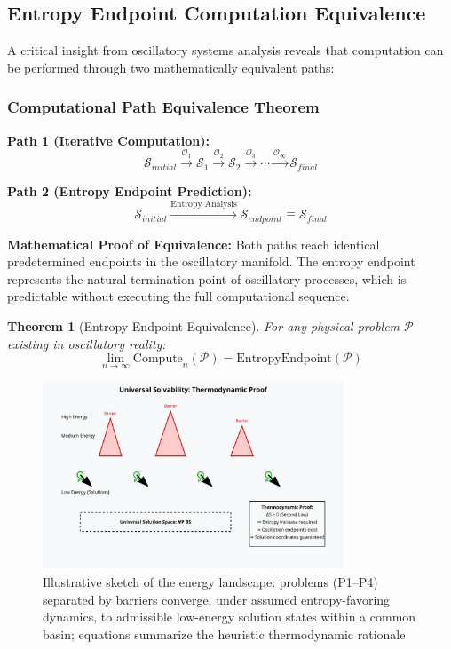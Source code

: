 \documentclass[12pt,a4paper]{article}
\newtheorem{theorem}{Theorem}
\begin{document}
\subsection{Entropy Endpoint Computation Equivalence}

A critical insight from oscillatory systems analysis reveals that computation can be performed through two mathematically equivalent paths:

\subsubsection{Computational Path Equivalence Theorem}

\textbf{Path 1 (Iterative Computation):}
\begin{equation}
\mathcal{S}_{initial} \xrightarrow{\mathcal{O}_1} \mathcal{S}_1 \xrightarrow{\mathcal{O}_2} \mathcal{S}_2 \xrightarrow{\mathcal{O}_3} \cdots \xrightarrow{\mathcal{O}_\infty} \mathcal{S}_{final}
\end{equation}

\textbf{Path 2 (Entropy Endpoint Prediction):}
\begin{equation}
\mathcal{S}_{initial} \xrightarrow{\text{Entropy Analysis}} \mathcal{S}_{endpoint} \equiv \mathcal{S}_{final}
\end{equation}

\textbf{Mathematical Proof of Equivalence:}
Both paths reach identical predetermined endpoints in the oscillatory manifold. The entropy endpoint represents the natural termination point of oscillatory processes, which is predictable without executing the full computational sequence.

\begin{theorem}[Entropy Endpoint Equivalence]
For any physical problem $\mathcal{P}$ existing in oscillatory reality:
\begin{equation}
\lim_{n \to \infty} \text{Compute}_n(\mathcal{P}) = \text{EntropyEndpoint}(\mathcal{P})
\end{equation}
\end{theorem}


\begin{figure}[H]
    \centering
    \includegraphics[width=0.8\textwidth]{images/universal-solvability-thermodynamic-proof.pdf}
    \caption{Illustrative sketch of the  energy landscape: problems (P1–P4) separated by barriers converge, under assumed entropy-favoring dynamics, to admissible low-energy solution states within a common basin; equations summarize the heuristic thermodynamic rationale}
    \label{fig:universal_computing}
    \end{figure}
\end{document}

